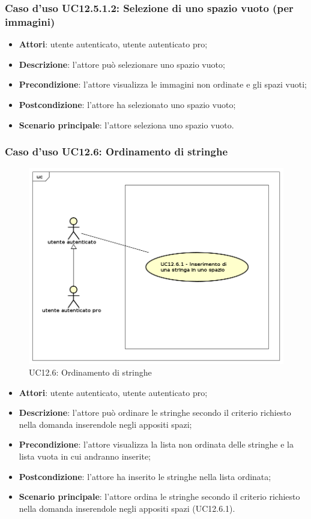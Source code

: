 \subsubsection{Caso d'uso UC12.5.1.2: Selezione di uno spazio vuoto (per immagini)}
\begin{itemize}
\item \textbf{Attori}: utente autenticato, utente autenticato pro;
\item \textbf{Descrizione}: l'attore può selezionare uno spazio vuoto;
\item \textbf{Precondizione}: l'attore visualizza le immagini non ordinate e gli spazi vuoti;
\item \textbf{Postcondizione}: l'attore ha selezionato uno spazio vuoto;
\item \textbf{Scenario principale}: l'attore seleziona uno spazio vuoto.
\end{itemize}

\subsubsection{Caso d'uso UC12.6: Ordinamento di stringhe}
\label{UC12.6}
\begin{figure}[h]
	\centering
	\includegraphics[scale=0.5]{UML/UC12_6.png}
	\caption{UC12.6: Ordinamento di stringhe}
\end{figure}
\begin{itemize}
\item \textbf{Attori}: utente autenticato, utente autenticato pro;
\item \textbf{Descrizione}: l'attore può ordinare le stringhe secondo il criterio richiesto nella domanda inserendole negli appositi spazi;
\item \textbf{Precondizione}: l'attore visualizza la lista non ordinata delle stringhe e la lista vuota in cui andranno inserite;
\item \textbf{Postcondizione}: l'attore ha inserito le stringhe nella lista ordinata;
\item \textbf{Scenario principale}: l'attore ordina le stringhe secondo il criterio richiesto nella domanda inserendole negli appositi spazi (UC12.6.1).
\end{itemize}

